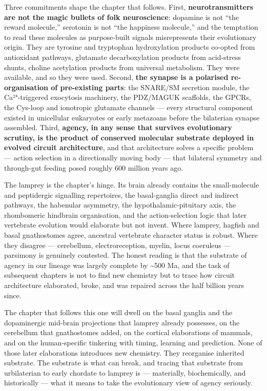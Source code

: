 Three commitments shape the chapter that follows. First, \textbf{neurotransmitters are not the magic bullets of folk neuroscience}: dopamine is not ``the reward molecule,'' serotonin is not ``the happiness molecule,'' and the temptation to read these molecules as purpose-built signals misrepresents their evolutionary origin. They are tyrosine and tryptophan hydroxylation products co-opted from antioxidant pathways, glutamate decarboxylation products from acid-stress shunts, choline acetylation products from universal metabolism. They were available, and so they were used. Second, \textbf{the synapse is a polarised re-organisation of pre-existing parts}: the SNARE/SM secretion module, the Ca²⁺-triggered exocytosis machinery, the PDZ/MAGUK scaffolds, the GPCRs, the Cys-loop and ionotropic glutamate channels --- every structural component existed in unicellular eukaryotes or early metazoans before the bilaterian synapse assembled. Third, \textbf{agency, in any sense that survives evolutionary scrutiny, is the product of conserved molecular substrate deployed in evolved circuit architecture}, and that architecture solves a specific problem --- action selection in a directionally moving body --- that bilateral symmetry and through-gut feeding posed roughly 600 million years ago.

The lamprey is the chapter's hinge. Its brain already contains the small-molecule and peptidergic signalling repertoires, the basal-ganglia direct and indirect pathways, the habenular asymmetry, the hypothalamic-pituitary axis, the rhombomeric hindbrain organisation, and the action-selection logic that later vertebrate evolution would elaborate but not invent. Where lamprey, hagfish and basal gnathostomes agree, ancestral vertebrate character status is robust. Where they disagree --- cerebellum, electroreception, myelin, locus coeruleus --- parsimony is genuinely contested. The honest reading is that the substrate of agency in our lineage was largely complete by \textasciitilde500 Ma, and the task of subsequent chapters is not to find new chemistry but to trace how circuit architecture elaborated, broke, and was repaired across the half billion years since.

The chapter that follows this one will dwell on the basal ganglia and the dopaminergic mid-brain projections that lamprey already possesses, on the cerebellum that gnathostomes added, on the cortical elaborations of mammals, and on the human-specific tinkering with timing, learning and prediction. None of those later elaborations introduces new chemistry. They reorganise inherited substrate. The substrate is what can break, and tracing that substrate from urbilaterian to early chordate to lamprey is --- materially, biochemically, and historically --- what it means to take the evolutionary view of agency seriously.

